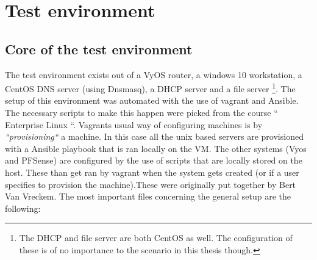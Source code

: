 

\chapter{Test environment}
\label{ch:TestEnvironment1}

\section{Core of the test environment}
The test environment exists out of a VyOS router, a windows 10 workstation, a CentOS DNS server (using Dnsmasq), a DHCP server and a file server \footnote{The DHCP and file server are both CentOS as well. The configuration of these is of no importance to the scenario in this thesis though.}. The setup of this environment was automated with the use of vagrant and Ansible. The necessary scripts to make this happen were picked from the course `` Enterprise Linux ``. Vagrants usual way of configuring machines is by \textit{``provisioning``} a machine. In this case all the unix based servers are provisioned with a Ansible playbook that is ran locally on the VM. The other systems (Vyos and PFSense) are configured by the use of scripts that are locally stored on the host. These than get ran by vagrant when the system gets created (or if a user specifies to provision the machine).These were originally put together by Bert Van Vreckem. The most important files concerning the general setup are the following:
